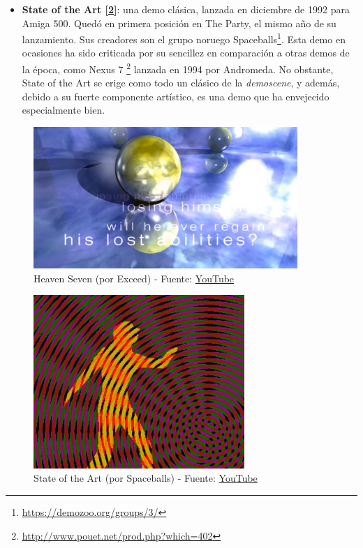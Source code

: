 \begin{itemize}
	\item \textbf{State of the Art [\ref{fig:stateoftheart}]}: una demo clásica, lanzada en diciembre de 1992 para Amiga 500. Quedó en primera posición en The Party, el mismo año de su lanzamiento. Sus creadores son el grupo noruego Spaceballs\footnote{\url{https://demozoo.org/groups/3/}}. Esta demo en ocasiones ha sido criticada por su sencillez en comparación a otras demos de la época, como Nexus 7 \footnote{\url{http://www.pouet.net/prod.php?which=402}} lanzada en 1994 por Andromeda. No obstante, State of the Art se erige como todo un clásico de la \emph{demoscene}, y además, debido a su fuerte componente artístico, es una demo que ha envejecido especialmente bien.
\end{itemize}

\begin{figure}[h]
	\centering
	\includegraphics[width=10cm]{archivos/heavenseven}
	\caption{Heaven Seven (por Exceed) - Fuente: \href{https://www.youtube.com/watch?v=rNqpD3Mg9hY}{YouTube}}
	\label{fig:heavenseven}
\end{figure}

\begin{figure}[h]
	\centering
	\includegraphics[width=8cm]{archivos/stateoftheart}
	\caption{State of the Art (por Spaceballs) - Fuente: \href{https://www.youtube.com/watch?v=J2r7-ygXOzo}{YouTube}}
	\label{fig:stateoftheart}
\end{figure}

